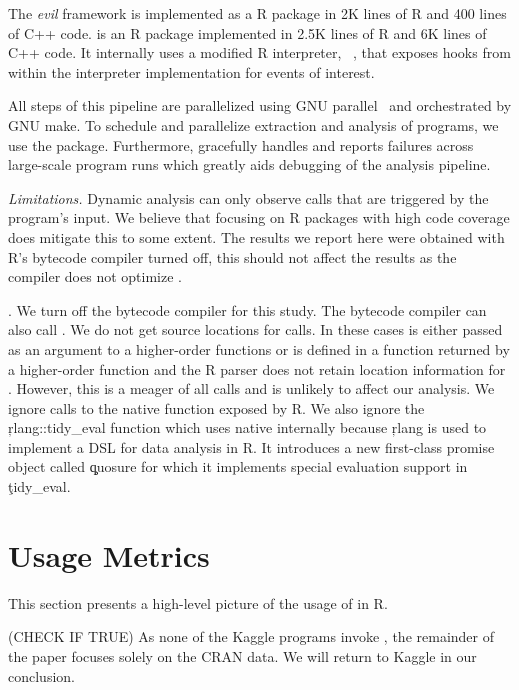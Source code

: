 \documentclass[USenglish,cleveref, autoref, thm-restate]{lipics-v2019}
\newcommand{\mypara}[1]{\medskip\noindent\emph{#1}\xspace}
\begin{document}
The \emph{evil} framework is implemented as a R package in 2K lines of
R and 400 lines of C++ code. \instrumentr is an R package implemented
in 2.5K lines of R and 6K lines of C++ code. It internally uses a
modified R interpreter, \rdyntrace~\cite{oopsla19a}, that exposes
hooks from within the interpreter implementation for events of
interest.

All steps of this pipeline are parallelized using GNU
parallel~\cite{GNUparallel} and orchestrated by GNU make. To schedule
and parallelize extraction and analysis of programs, we use the \runr
package. Furthermore, \runr gracefully handles and reports failures
across large-scale program runs which greatly aids debugging of the
analysis pipeline.



\mypara{Limitations.} Dynamic analysis can only observe
calls that are triggered by the program's input. We believe that
focusing on R packages with high code coverage does mitigate this to
some extent. The results we report here were obtained with R's
bytecode compiler turned off, this should not affect the results as
the compiler does not optimize \eval.


. We turn off the
bytecode compiler for this study. The bytecode compiler can also call
\eval. We do not get source locations for \UndefinedEvalsRnd \eval
calls. In these cases \eval is either passed as an argument to a
higher-order functions or is defined in a function returned by a
higher-order function and the R parser does not retain location
information for \eval. However, this is a meager \PercentUndefinedEval
of all \eval calls and is unlikely to affect our analysis. We ignore
calls to the native \eval function exposed by R. We also ignore the
\c{rlang::tidy_eval} function which uses native \eval internally
because \c{rlang} is used to implement a DSL for data analysis in R.
It introduces a new first-class promise object called \c{quosure} for
which it implements special evaluation support in \c{tidy_eval}.


\section{Usage Metrics}

This section presents a high-level picture of the usage of \eval in R.

(CHECK IF TRUE) As none of the Kaggle programs invoke \eval, the
remainder of the paper focuses solely on the CRAN data. We will return
to Kaggle in our conclusion.
\end{document}
